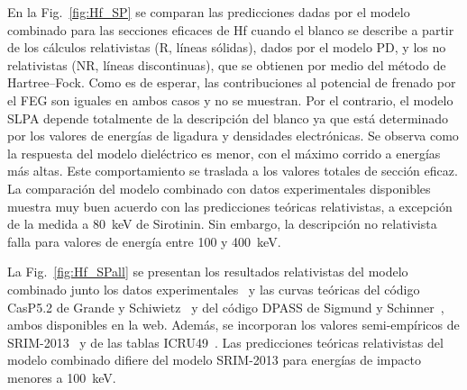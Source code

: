En la Fig.~\ref{fig:Hf_SP} se comparan las predicciones dadas por el 
modelo combinado para las secciones eficaces de Hf cuando el blanco se 
describe a partir de los cálculos relativistas (R, líneas sólidas), 
dados por el modelo PD, y los no relativistas (NR, líneas discontinuas), 
que se obtienen por medio del método de Hartree--Fock. Como es de 
esperar, las contribuciones al potencial de frenado por el FEG son 
iguales en ambos casos y no se muestran. Por el contrario, el modelo 
SLPA depende totalmente de la descripción del blanco ya que está 
determinado por los valores de energías de ligadura y densidades 
electrónicas. Se observa como la respuesta del modelo dieléctrico es 
menor, con el máximo corrido a energías más altas. Este comportamiento 
se traslada a los valores totales de sección eficaz. La comparación del 
modelo combinado con datos experimentales 
disponibles~\cite{Montanari:20,Sirotinin} muestra muy buen acuerdo con 
las predicciones teóricas relativistas, a excepción de la medida a 
80~keV de Sirotinin. Sin embargo, la descripción no relativista falla 
para valores de energía entre 100 y 400~keV. 

La Fig.~\ref{fig:Hf_SPall} se presentan los resultados relativistas del 
modelo combinado junto los datos 
experimentales~\cite{Montanari:20,Sirotinin} y las curvas teóricas 
del código CasP5.2 de Grande y Schiwietz~\cite{Grande:01,casp52} y del 
código DPASS de Sigmund y Schinner~\cite{DPASS20}, ambos disponibles en 
la web. Además, se incorporan los valores semi-empíricos de 
SRIM-2013~\cite{Ziegler01} y de las tablas ICRU49~\cite{ICRU49}. 
Las predicciones teóricas relativistas del modelo combinado difiere del
modelo SRIM-2013 para energías de impacto menores a 100~keV. 

